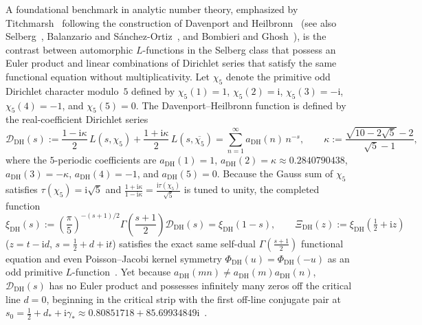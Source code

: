 \documentclass[11pt,reqno]{amsart}
\theoremstyle{definition}
\theoremstyle{remark}
\numberwithin{equation}{section}
\newcommand{\ii}{\mathrm{i}}
\newcommand{\DHf}{\mathrm{DH}}
\begin{document}
A foundational benchmark in analytic number theory, emphasized by Titchmarsh~\cite[\S10.25]{titchmarsh1986} following the construction of Davenport and Heilbronn~\cite{davenport1936} (see also Selberg~\cite{selberg1992}, Balanzario and S\'anchez-Ortiz~\cite{balanzario2007}, and Bombieri and Ghosh~\cite{bombieri2011}), is the contrast between automorphic $L$-functions in the Selberg class that possess an Euler product and linear combinations of Dirichlet series that satisfy the same functional equation without multiplicativity. Let $\chi_5$ denote the primitive odd Dirichlet character modulo~$5$ defined by $\chi_5(1) = 1$, $\chi_5(2) = \ii$, $\chi_5(3) = -\ii$, $\chi_5(4) = -1$, and $\chi_5(5) = 0$. The Davenport--Heilbronn function is defined by the real-coefficient Dirichlet series
\begin{equation}\label{eq:dh_def}
\mathcal{D}_{\DHf}(s) := \frac{1 - \ii\kappa}{2}\,L(s, \chi_5) + \frac{1 + \ii\kappa}{2}\,L(s, \overline{\chi_5}) = \sum_{n=1}^{\infty} a_{\DHf}(n)\,n^{-s}, \qquad \kappa := \frac{\sqrt{10 - 2\sqrt{5}} - 2}{\sqrt{5} - 1},
\end{equation}
where the $5$-periodic coefficients are $a_{\DHf}(1) = 1$, $a_{\DHf}(2) = \kappa \approx 0.2840790438$, $a_{\DHf}(3) = -\kappa$, $a_{\DHf}(4) = -1$, and $a_{\DHf}(5) = 0$. Because the Gauss sum of $\chi_5$ satisfies $\tau(\chi_5) = \ii\sqrt{5}$ and $\frac{1+\ii\kappa}{1-\ii\kappa} = \frac{\ii\tau(\chi_5)}{\sqrt{5}}$ is tuned to unity, the completed function
\begin{equation}\label{eq:xi_dh_def}
\xi_{\DHf}(s) := \left(\frac{\pi}{5}\right)^{-(s+1)/2}\Gamma\!\left(\frac{s+1}{2}\right)\mathcal{D}_{\DHf}(s) = \xi_{\DHf}(1 - s), \qquad \Xi_{\DHf}(z) := \xi_{\DHf}\!\left(\tfrac{1}{2} + \ii z\right)
\end{equation}
($z = t - \ii d$, $s = \frac{1}{2} + d + \ii t$) satisfies the exact same self-dual $\Gamma(\frac{s+1}{2})$ functional equation and even Poisson--Jacobi kernel symmetry $\Phi_{\DHf}(u) = \Phi_{\DHf}(-u)$ as an odd primitive $L$-function~\cite{riemann1859,jacobi1829,polya1926}. Yet because $a_{\DHf}(mn) \neq a_{\DHf}(m)a_{\DHf}(n)$, $\mathcal{D}_{\DHf}(s)$ has no Euler product and possesses infinitely many zeros off the critical line $d = 0$, beginning in the critical strip with the first off-line conjugate pair at $s_0 = \frac{1}{2} + d_* + \ii\gamma_* \approx 0.80851718 + 85.69934849\ii$~\cite{spira1994,balanzario2007}.
\end{document}
